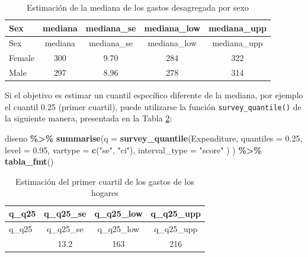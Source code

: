 \documentclass[
  spanish,
  12pt,
]{book}
\newenvironment{Shaded}{\begin{snugshade}}{\end{snugshade}}
\newcommand{\AttributeTok}[1]{\textcolor[rgb]{0.13,0.29,0.53}{#1}}
\newcommand{\FloatTok}[1]{\textcolor[rgb]{0.00,0.00,0.81}{#1}}
\newcommand{\FunctionTok}[1]{\textcolor[rgb]{0.13,0.29,0.53}{\textbf{#1}}}
\newcommand{\NormalTok}[1]{#1}
\newcommand{\SpecialCharTok}[1]{\textcolor[rgb]{0.81,0.36,0.00}{\textbf{#1}}}
\newcommand{\StringTok}[1]{\textcolor[rgb]{0.31,0.60,0.02}{#1}}
\begin{document}
\begin{longtable}[]{@{}lcccc@{}}
\caption{\label{tab:tab-mediana-gasto-sexo}Estimación de la mediana de los gastos desagregada por sexo}\tabularnewline
\toprule\noalign{}
Sex & mediana & mediana\_se & mediana\_low & mediana\_upp \\
\midrule\noalign{}
\endfirsthead
\toprule\noalign{}
Sex & mediana & mediana\_se & mediana\_low & mediana\_upp \\
\midrule\noalign{}
\endhead
\bottomrule\noalign{}
\endlastfoot
Female & 300 & 9.70 & 284 & 322 \\
Male & 297 & 8.96 & 278 & 314 \\
\end{longtable}

Si el objetivo es estimar un cuantil específico diferente de la mediana, por ejemplo el cuantil 0.25 (primer cuartil), puede utilizarse la función \texttt{survey\_quantile()} de la siguiente manera, presentada en la Tabla \ref{tab:tab-cuantil-gasto}:

\begin{Shaded}
\begin{Highlighting}[]
\NormalTok{diseno }\SpecialCharTok{\%\textgreater{}\%}
  \FunctionTok{summarise}\NormalTok{(}\AttributeTok{q =} \FunctionTok{survey\_quantile}\NormalTok{(Expenditure,}
                                \AttributeTok{quantiles =} \FloatTok{0.25}\NormalTok{,}
                                \AttributeTok{level =} \FloatTok{0.95}\NormalTok{,}
                                \AttributeTok{vartype =}  \FunctionTok{c}\NormalTok{(}\StringTok{"se"}\NormalTok{, }\StringTok{"ci"}\NormalTok{),}
                                \AttributeTok{interval\_type =} \StringTok{"score"}
\NormalTok{                                )}
\NormalTok{            ) }\SpecialCharTok{\%\textgreater{}\%}
  \FunctionTok{tabla\_fmt}\NormalTok{()}
\end{Highlighting}
\end{Shaded}

\begin{longtable}[]{@{}lccc@{}}
\caption{\label{tab:tab-cuantil-gasto}Estimación del primer cuartil de los gastos de los hogares}\tabularnewline
\toprule\noalign{}
q\_q25 & q\_q25\_se & q\_q25\_low & q\_q25\_upp \\
\midrule\noalign{}
\endfirsthead
\toprule\noalign{}
q\_q25 & q\_q25\_se & q\_q25\_low & q\_q25\_upp \\
\midrule\noalign{}
\endhead
\bottomrule\noalign{}
\endlastfoot
200 & 13.2 & 163 & 216 \\
\end{longtable}
\end{document}
